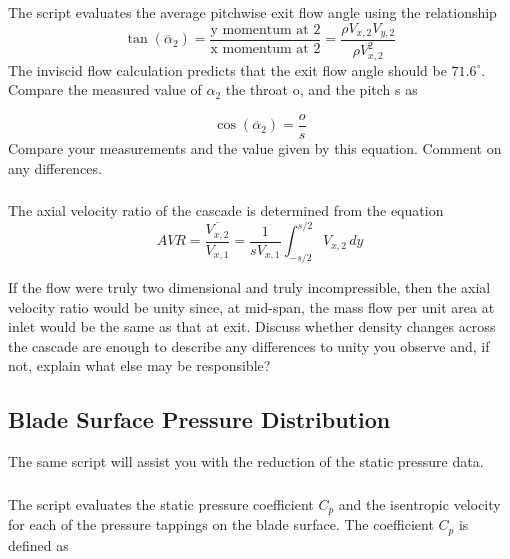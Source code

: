 \documentclass{article}
\begin{document}
\subsubsection{}
The script evaluates the average pitchwise exit flow angle using the relationship
\begin{equation}
    \tan (\overline{\alpha}_2) = \frac{\text{y momentum at 2}}{\text{x momentum at 2}} = \frac{\rho V_{x,2}V_{y,2}}{\rho V_{x,2}^2}
\end{equation}
The inviscid flow calculation predicts that the exit flow angle should be $71.6^\circ$. Compare the
measured value of $\alpha_2$ the throat o, and the pitch s as

\begin{equation}
    \cos (\overline{\alpha}_2) = \frac{o}{s}
\end{equation}
Compare your measurements and the value given by this equation. Comment on any
differences.

\subsubsection{}
The axial velocity ratio of the cascade is determined from the equation
\begin{equation}
    AVR = \frac{\overline{V_{x,2}}}{V_{x,1}} = \frac{1}{s V_{x,1}} \int_{-s/2}^{s/2} V_{x,2} \, dy
\end{equation}

If the flow were truly two dimensional and truly incompressible, then the axial velocity ratio
would be unity since, at mid-span, the mass flow per unit area at inlet would be the same as
that at exit. Discuss whether density changes across the cascade are enough to describe any
differences to unity you observe and, if not, explain what else may be responsible?

\subsection{Blade Surface Pressure Distribution}

The same script will assist you with the reduction of the static pressure data.
\subsubsection{}
The script evaluates the static pressure coefficient $C_p$ and the isentropic velocity for
each of the pressure tappings on the blade surface. The coefficient $C_p$ is defined as
\end{document}
